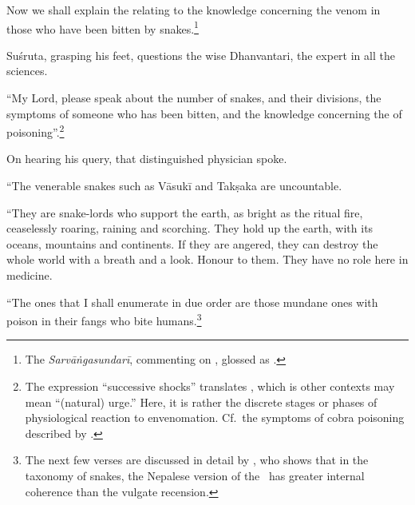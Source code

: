 \begin{translation}
    \item[1] Now we shall explain the  relating to the
knowledge concerning the venom in those who have been bitten by
snakes.\footnote{The \emph{Sarvāṅgasundarī}, commenting on
    , glossed  as .}
    
    \item[3] Suśruta, grasping his feet, questions the wise Dhanvantari, the 
    expert in all the sciences.
    
    \item[4]
    
    “My Lord, please speak about the number of snakes, and their divisions,
the symptoms of someone who has been bitten, and the knowledge
concerning the  of poisoning”.\footnote{The
    expression “successive shocks” translates , which is other
    contexts may mean “(natural) urge.”  Here, it is rather the discrete
    stages or phases of physiological reaction to envenomation.  Cf.\ the
    symptoms of cobra poisoning described by \citet[80]{wall-1913}.}
        
    \item[5]
    
    On hearing his query, that distinguished physician spoke.
    
    “The venerable snakes such as Vāsukī and Takṣaka are uncountable. 
    
\item[6--9ab]

“They are snake-lords who support the earth, as bright as the ritual fire,
ceaselessly roaring, raining and scorching. They hold up the earth, with its
oceans, mountains and continents. If they are angered, they can destroy the
whole world with a breath and a look.  Honour to them. They have no role
here in medicine.

“The ones that I shall enumerate in due order are those mundane
ones with poison in their fangs who bite humans.\footnote{The next few
    verses are discussed in detail by \citet[101--104]{hari-2011}, who shows
    that in the taxonomy of snakes, the Nepalese version of the \SS\ has greater
    internal coherence than the vulgate recension.}


\end{translation}

